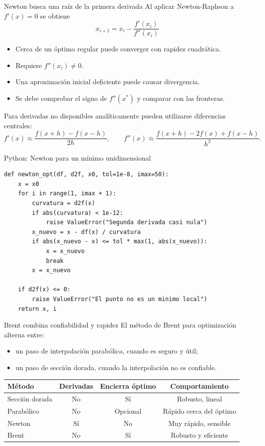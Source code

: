 \documentclass[../../main.tex]{subfiles}
\begin{document}
\begin{frame}{Newton busca una raíz de la primera derivada}
Al aplicar Newton-Raphson a $f'(x)=0$ se obtiene
\[
\boxed{
x_{i+1}=x_i-\frac{f'(x_i)}{f''(x_i)}
}
\]

\begin{itemize}
  \item Cerca de un óptimo regular puede converger con rapidez cuadrática.
  \item Requiere $f''(x_i)\neq0$.
  \item Una aproximación inicial deficiente puede causar divergencia.
  \item Se debe comprobar el signo de $f''(x^*)$ y comparar con las fronteras.
\end{itemize}

Para derivadas no disponibles analíticamente pueden utilizarse diferencias centrales:
\[
f'(x)\approx\frac{f(x+h)-f(x-h)}{2h},
\qquad
f''(x)\approx\frac{f(x+h)-2f(x)+f(x-h)}{h^2}.
\]
\end{frame}

\begin{frame}[fragile]{Python: Newton para un mínimo unidimensional}
\scriptsize
\begin{lstlisting}[style=mypython]
def newton_opt(df, d2f, x0, tol=1e-8, imax=50):
    x = x0
    for i in range(1, imax + 1):
        curvatura = d2f(x)
        if abs(curvatura) < 1e-12:
            raise ValueError("Segunda derivada casi nula")
        x_nuevo = x - df(x) / curvatura
        if abs(x_nuevo - x) <= tol * max(1, abs(x_nuevo)):
            x = x_nuevo
            break
        x = x_nuevo

    if d2f(x) <= 0:
        raise ValueError("El punto no es un minimo local")
    return x, i
\end{lstlisting}
\end{frame}

\begin{frame}{Brent combina confiabilidad y rapidez}
El método de Brent para optimización alterna entre:
\begin{itemize}
  \item un paso de interpolación parabólica, cuando es seguro y útil;
  \item un paso de sección dorada, cuando la interpolación no es confiable.
\end{itemize}

\begin{center}
\begin{tabular}{lccc}
\toprule
\textbf{Método} & \textbf{Derivadas} & \textbf{Encierra óptimo} & \textbf{Comportamiento}\\
\midrule
Sección dorada & No & Sí & Robusto, lineal\\
Parabólico & No & Opcional & Rápido cerca del óptimo\\
Newton & Sí & No & Muy rápido, sensible\\
Brent & No & Sí & Robusto y eficiente\\
\bottomrule
\end{tabular}
\end{center}
\end{frame}
\end{document}
